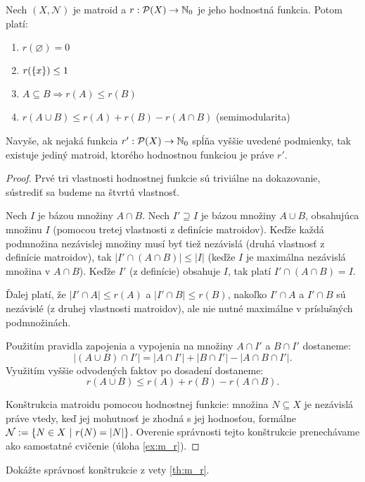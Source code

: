 \begin{theorem}
\label{th:m_r}
Nech $(X, \mathcal{N})$ je matroid a $r:\mathcal{P}(X) \to \mathbb{N}_0$ je jeho hodnostná funkcia. Potom platí:
\begin{enumerate}
    \item $r(\varnothing) = 0$
    \item $r(\left\{x\right\}) \leq 1$
    \item $A \subseteq B \Longrightarrow r(A) \leq r(B)$
    \item $r(A \cup B) \leq r(A) + r(B) - r(A \cap B)$ (semimodularita)
\end{enumerate}

Navyše, ak nejaká funkcia $r':\mathcal{P}(X)\to\mathbb{N}_0$ spĺňa vyššie uvedené podmienky, tak existuje jediný matroid, ktorého
hodnostnou funkciou je práve $r'$.
\end{theorem}
\begin{toreview}
\begin{proof}
Prvé tri vlastnosti hodnostnej funkcie sú triviálne na dokazovanie, sústrediť sa budeme na štvrtú vlastnosť.

Nech $I$ je bázou množiny $A\cap B$.
Nech $I' \supseteq I$ je bázou množiny $A \cup B$, obsahujúca množinu $I$ (pomocou tretej vlastnosti z definície matroidov).
Keďže každá podmnožina nezávislej množiny musí byť tiež nezávislá (druhá vlastnosť z definície matroidov), tak $|I' \cap (A \cap B)| \leq |I|$ (keďže $I$ je maximálna nezávislá množina v $A\cap B$). Keďže $I'$ (z definície) obsahuje $I$, tak platí $I' \cap (A \cap B) = I$. 

Ďalej platí, že $|I' \cap A| \leq r(A)$ a $|I' \cap B| \leq r(B)$, nakoľko $I' \cap A$ a $I' \cap B$ sú nezávislé (z druhej vlastnosti matroidov), ale nie nutné maximálne v príslušných podmnožinách.

Použitím pravidla zapojenia a vypojenia na množiny $A \cap I'$ a $B \cap I'$ dostaneme:
$$|(A \cup B) \cap I'| = |A \cap I'| + |B \cap I'| - |A \cap B \cap I'|.$$
Využitím vyššie odvodených faktov po dosadení dostaneme:
$$r(A \cup B) \leq r(A) + r(B) - r(A \cap B).$$

Konštrukcia matroidu pomocou hodnostnej funkcie: množina $N \subseteq X$ je nezávislá práve vtedy, keď jej mohutnosť je zhodná s jej hodnosťou, formálne $\mathcal{N} := \left\{N \in X~|~r(N) = |N|\right\}$. Overenie správnosti tejto konštrukcie prenechávame ako samostatné cvičenie (úloha \ref{ex:m_r}).
\end{proof}
\begin{exercise}
\label{ex:m_r}
Dokážte správnosť konštrukcie z vety \ref{th:m_r}.
\end{exercise}
\end{toreview}


